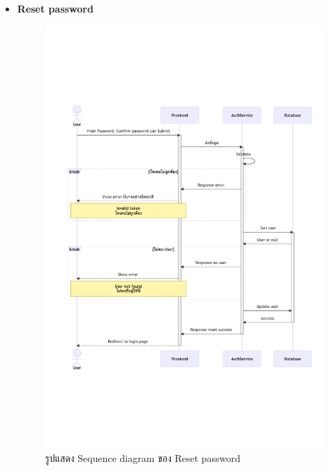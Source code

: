 \documentclass[12pt,oneside,openright,a4paper]{cpe-thai-project}
\begin{document}
\begin{itemize}
    
    \newpage
    \item \textbf{Reset password} \\
    \begin{figure}[!ht]\centering
        \includegraphics[width=13cm, trim={0 7cm 0 7cm},clip]{./assets/sequence-diagram/reset-password.png}
        \caption{รูปแสดง Sequence diagram ของ Reset password}\label{fig:sqResetPassword}
    \end{figure}


\end{itemize}
\end{document}
